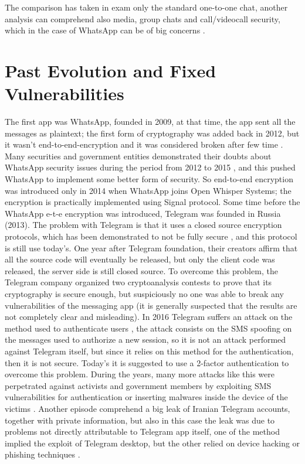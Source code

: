 \documentclass{article}
\begin{document}
The comparison has taken in exam only the standard one-to-one chat, another analysis can comprehend also media, group chats and call/videocall security, which in the case of WhatsApp can be of big concerns \cite{what_security_threat}.
 

\section{Past Evolution and Fixed Vulnerabilities}

The first app was WhatsApp, founded in 2009, at that time, the app sent all the messages as plaintext; the first form of cryptography was added back in 2012, but it wasn't end-to-end-encryption and it was considered broken after few time \cite{what_threat}. Many securities and government entities demonstrated their doubts about WhatsApp security issues during the period from 2012 to 2015 \cite{what_threat}, and this pushed WhatsApp to implement some better form of security. So end-to-end encryption was introduced only in 2014 \cite{what_ete} when WhatsApp joins Open Whisper Systems; the encryption is practically implemented using Signal protocol. Some time before the WhatsApp e-t-e encryption was introduced, Telegram was founded in Russia (2013). The problem with Telegram is that it uses a closed source encryption protocols, which has been  demonstrated to not be fully secure \cite{MT_insecure}, and this protocol is still use today's. One year after Telegram foundation, their creators affirm that all the source code will eventually be released, but only the client code was released, the server side is still closed source. To overcome this problem, the Telegram company organized two cryptoanalysis contests \cite{contest1} \cite{contest1} to prove that its cryptography is secure enough, but suspiciously no one was able to break any vulnerabilities of the messaging app (it is generally suspected that the results are not completely clear and misleading). \newline
In 2016 Telegram suffers an attack on the method used to authenticate users \cite{2factor}, the attack consists on the SMS spoofing on the messages used to authorize a new session, so it is not an attack performed against Telegram itself, but since it relies on this method for the authentication, then it is not secure. Today's it is suggested to use a 2-factor authentication to overcome this problem. During the years, many more attacks like this were perpetrated against activists and government members by exploiting SMS vulnerabilities for authentication or inserting malwares inside the device of the victims \cite{brasil_leak} \cite{russia_leak} \cite{telegram_gate}. Another episode comprehend a big leak of Iranian Telegram accounts, together with private information, but also in this case the leak was due to problems not directly attributable to Telegram app itself, one of the method implied the exploit of Telegram desktop, but the other relied on device hacking or phishing techniques \cite{iran_leak}. \newline
\end{document}
